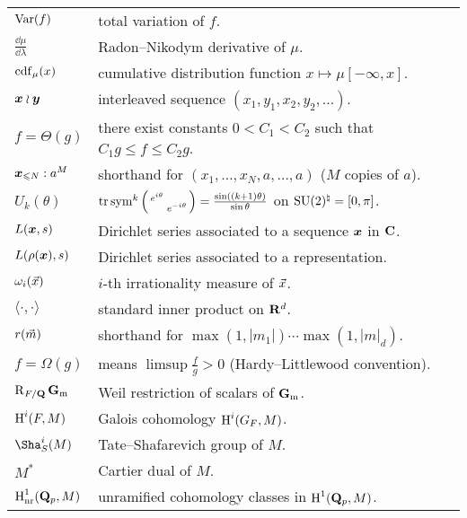 \documentclass[phd,tocprelim]{cornell}
\begin{document}
\begin{tabular}{ll}
$\operatorname{Var}(f)$
	& total variation of $f$. \\
$\frac{\dd\mu}{\dd\lambda}$
	& Radon--Nikodym derivative of $\mu$. \\
$\operatorname{cdf}_\mu(x)$
	& cumulative distribution function $x\mapsto \mu[-\infty,x]$. \\	
${\boldsymbol x}\wr{\boldsymbol y}$
	& interleaved sequence $(x_1,y_1,x_2,y_2,\dots)$. \\
$f = \Theta(g)$
	& there exist constants $0 < C_1 < C_2$ such that $C_1 g \leqslant f \leqslant C_2 g$. \\
${\boldsymbol x}_{\leqslant N} : a^M$
	& shorthand for $(x_1,\dots,x_N,a,\dots,a)$ ($M$ copies of $a$). \\
$U_k(\theta)$
	& $\operatorname{tr}\operatorname{sym}^k\left(\begin{smallmatrix} e^{i\theta} &  \\  & e^{-i\theta} \end{smallmatrix}\right) = \frac{\sin((k+1)\theta)}{\sin\theta}$ on $\operatorname{SU}(2)^\natural = [0,\pi]$. \\
$L({\boldsymbol x},s)$
	& Dirichlet series associated to a sequence ${\boldsymbol x}$ in $\mathbf{C}$. \\
$L(\rho({\boldsymbol x}),s)$
	& Dirichlet series associated to a representation. \\
$\omega_i(\vec{x})$
	& $i$-th irrationality measure of $\vec{x}$. \\
$\langle \cdot,\cdot\rangle$
	& standard inner product on $\mathbf{R}^d$. \\
$r(\vec{m})$
	& shorthand for $\max(1,|m_1|) \cdots \max(1,|m|_d)$. \\
$f = \Omega(g)$
	& means $\limsup \frac f g > 0$ (Hardy--Littlewood convention). \\
$\operatorname{R}_{F/\mathbf{Q}} \mathbf{G}_\mathrm{m}$
	& Weil restriction of scalars of $\mathbf{G}_\mathrm{m}$. \\
$\operatorname{H}^i(F,M)$
	& Galois cohomology $\operatorname{H}^i(G_F,M)$. \\
$\Sha^i_S(M)$
	& Tate--Shafarevich group of $M$. \\
$M^\ast$
	& Cartier dual of $M$. \\
$\operatorname{H}_{\mathrm{nr}}^1(\mathbf{Q}_p,M)$
	& unramified cohomology classes in $\operatorname{H}^1(\mathbf{Q}_p,M)$. 
\end{tabular}
\newpage





\normalspacing
\setcounter{page}{1}
\pagestyle{cornell}
\addtolength{\parskip}{0.5\baselineskip}

















\end{document}
